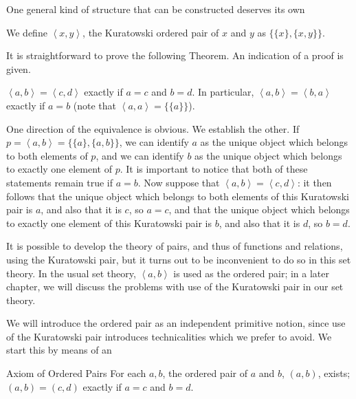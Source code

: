 One general kind of structure that can be constructed deserves
its own

\begin{definition}
 We define $\left<x,y\right>$, the {\upshape Kuratowski ordered
 pair of $x$ and $y$\/}
 as $\{\{x\},\{x,y\}\}$.
\end{definition}

It is straightforward to prove the following Theorem.  An indication of a proof is given.

\begin{thm}
 $\left<a,b\right> = \left<c,d\right>$ exactly if $a = c$ and $b = d$.  In
 particular, $\left<a,b\right> = \left<b,a\right>$ exactly if $a = b$ (note
 that $\left<a,a\right> = \{\{a\}\}$).
\end{thm}

\preuve  One direction of the equivalence is obvious.  We establish the other.
If $p=\left<a,b\right>=\{\{a\},\{a,b\}\}$, we can identify $a$ as the unique object which belongs to both elements of $p$,
and we can identify $b$ as the unique object which belongs to exactly one element of $p$.  It is important to notice that both of these statements remain true if $a=b$.
Now suppose that $\left<a,b\right> = \left<c,d\right>$:  it then follows that the unique object which belongs to both elements of this Kuratowski pair is $a$, and also that it is $c$, so $a=c$,
and that the unique object which belongs to exactly one element of this Kuratowski pair is $b$, and also that it is $d$, so $b=d$.  \finpreuve

It is possible to develop the theory of pairs, and thus of
functions and relations, using the Kuratowski pair, but it
turns out to be inconvenient to do so in this set theory.  In the
usual set
theory, $\left<a,b\right>$ is used as the ordered pair; in a later
chapter, we will discuss the problems with use of the Kuratowski pair
in our set theory.

We will introduce the ordered pair as an independent primitive
notion, since use of the Kuratowski pair introduces technicalities
which we prefer to avoid.  We start this by means of an

\begin{axiom}{Axiom of Ordered Pairs}
  For each $a, b$, the {\upshape ordered pair of $a$ and $b$},
  $(a,b)$, exists; $(a,b) = (c,d)$ exactly if $a = c$ and $b = d$.
\end{axiom}

